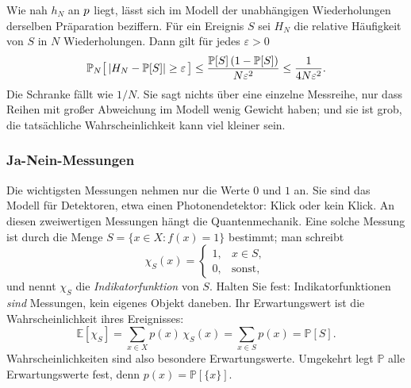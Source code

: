 \begin{webonly}
Wie nah $h_N$ an $p$ liegt, lässt sich im Modell der unabhängigen Wiederholungen derselben Präparation beziffern. Für ein Ereignis $S$ sei $H_N$ die relative Häufigkeit von $S$ in $N$ Wiederholungen. Dann gilt für jedes $\varepsilon > 0$
\begin{equation*}
	\mathbb{P}_N\bigl[\,\left\lvert H_N - \mathbb{P}[S] \right\rvert \geq \varepsilon\,\bigr] \leq \frac{\mathbb{P}[S]\,(1 - \mathbb{P}[S])}{N\varepsilon^2} \leq \frac{1}{4N\varepsilon^2}.
\end{equation*}
Die Schranke fällt wie $1/N$. Sie sagt nichts über eine einzelne Messreihe, nur dass Reihen mit großer Abweichung im Modell wenig Gewicht haben; und sie ist grob, die tatsächliche Wahrscheinlichkeit kann viel kleiner sein.
\end{webonly}


\subsubsection{Ja-Nein-Messungen}
Die wichtigsten Messungen nehmen nur die Werte $0$ und $1$ an. Sie sind das Modell für Detektoren, etwa einen Photonendetektor: Klick oder kein Klick. An diesen zweiwertigen Messungen hängt die Quantenmechanik. Eine solche Messung ist durch die Menge $S = \{x \in X \colon f(x) = 1\}$ bestimmt; man schreibt
\begin{equation}
	\chi_S(x) = \begin{cases} 1, & x \in S, \\ 0, & \text{sonst,} \end{cases}
\end{equation}
und nennt $\chi_S$ die \emph{Indikatorfunktion} von $S$. Halten Sie fest: Indikatorfunktionen \emph{sind} Messungen, kein eigenes Objekt daneben. Ihr Erwartungswert ist die Wahrscheinlichkeit ihres Ereignisses:
\begin{equation}\label{eq:indicatorfunction}
	\mathbb{E}[\chi_S] = \sum_{x \in X} p(x)\, \chi_S(x) = \sum_{x \in S} p(x) = \mathbb{P}[S].
\end{equation}
Wahrscheinlichkeiten sind also besondere Erwartungswerte. Umgekehrt legt $\mathbb{P}$ alle Erwartungswerte fest, denn $p(x) = \mathbb{P}[\{x\}]$.

